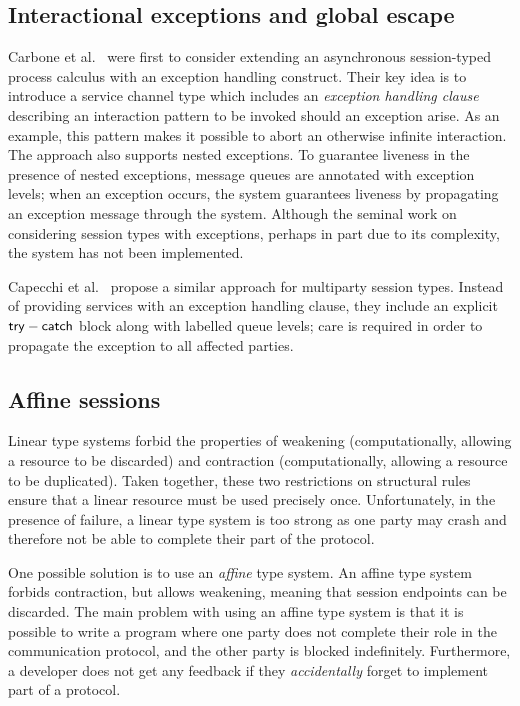 \documentclass[
graybox,
envcountchap
]{svmult}
\begin{document}
\begin{bibunit}
  \subsection{Interactional exceptions and global escape}
  Carbone et al.~\cite{CarboneHY08:exceptions} were first to consider extending
  an asynchronous session-typed process calculus with an exception handling
  construct. Their key idea is to introduce a service channel type which includes an
  \emph{exception handling clause} describing an interaction pattern to be
  invoked should an exception arise. As an example, this pattern makes it
  possible to abort an otherwise infinite interaction. The approach also
  supports nested exceptions. To guarantee liveness in the presence of nested
  exceptions, message queues are annotated with exception levels; when an
  exception occurs, the system guarantees liveness by propagating an exception
  message through the system. Although the seminal work on considering session
  types with exceptions, perhaps in part due to its complexity, the system has
  not been implemented.

  Capecchi et al.~\cite{CapecchiGY16:global-escape} propose a similar approach
  for multiparty session types. Instead of providing services with an exception
  handling clause, they include an explicit $\mathsf{try}-\mathsf{catch}$ block
  along with labelled queue levels; care is required in order to propagate the
  exception to all affected parties.

  \subsection{Affine sessions}

  Linear type systems forbid the properties of weakening (computationally,
  allowing a resource to be discarded) and contraction (computationally,
  allowing a resource to be duplicated).  Taken together, these two restrictions
  on structural rules ensure that a linear resource must be used precisely once.
  Unfortunately, in the presence of failure, a linear type system is too strong
  as one party may crash and therefore not be able to complete their part of the
  protocol.

  One possible solution is to use an \emph{affine} type system. An affine type
  system forbids contraction, but allows weakening,
  meaning that session endpoints can be discarded.
%
  The main problem with using an affine type system is that it is possible to
  write a program where one party does not complete their role in the
  communication protocol, and the other party is blocked indefinitely.
  Furthermore, a developer does not get any feedback if they \emph{accidentally}
  forget to implement part of a protocol.


\end{bibunit}
\end{document}
